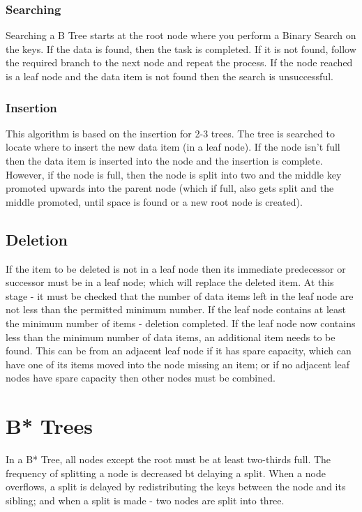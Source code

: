 \subsubsection{Searching}
Searching a B Tree starts at the root node where you perform a Binary Search on the keys. If the data is found, then the task is completed. If it is not found, follow the required branch to the next node and repeat the process. If the node reached is a leaf node and the data item is not found then the search is unsuccessful.
\subsubsection{Insertion}
This algorithm is based on the insertion for 2-3 trees. The tree is searched to locate where to insert the new data item (in a leaf node). If the node isn't full then the data item is inserted into the node and the insertion is complete. However, if the node is full, then the node is split into two and the middle key promoted upwards into the parent node (which if full, also gets split and the middle promoted, until space is found or a new root node is created). 
\subsection{Deletion}
If the item to be deleted is not in a leaf node then its immediate predecessor or successor must be in a leaf node; which will replace the deleted item. At this stage - it must be checked that the number of data items left in the leaf node are not less than the permitted minimum number. If the leaf node contains at least the minimum number of items - deletion completed. If the leaf node now contains less than the minimum number of data items, an additional item needs to be found. This can be from an adjacent leaf node if it has spare capacity, which can have one of its items moved into the node missing an item; or if no adjacent leaf nodes have spare capacity then other nodes must be combined. 

\section{B* Trees}
In a B* Tree, all nodes except the root must be at least two-thirds full. The frequency of splitting a node is decreased bt delaying a split. When a node overflows, a split is delayed by redistributing the keys between the node and its sibling; and when a split is made - two nodes are split into three.

